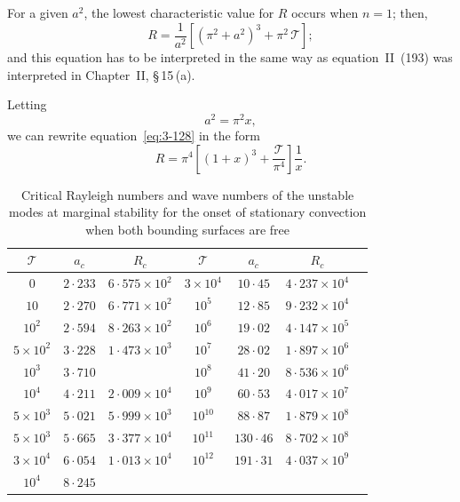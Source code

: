 For a given $a^2$, the lowest characteristic value for $R$ occurs when $n = 1$; then,
\begin{equation}\label{eq:3-128}
R = \frac{1}{a^2}[(\pi^2 + a^2)^3 + \pi^2\,\mathscr{T}];
\end{equation}
and this equation has to be interpreted in the same way as equation~II~(193) was interpreted in Chapter~II, \S\,15\,(a).

Letting
\begin{equation}\label{eq:3-129}
a^2 = \pi^2 x,
\end{equation}
we can rewrite equation~\eqref{eq:3-128} in the form
\begin{equation}\label{eq:3-130}
R = \pi^4\!\left[(1+x)^3 + \frac{\mathscr{T}}{\pi^4}\right]\!\frac{1}{x}.
\end{equation}

\begin{table}[ht]
\centering
\caption{Critical Rayleigh numbers and wave numbers of the unstable modes at marginal stability for the onset of stationary convection when both bounding surfaces are free}
\label{tab:VII}
\begin{tabular}{ccccccc}
\hline
$\mathscr{T}$ & $a_c$ & $R_c$ & $\mathscr{T}$ & $a_c$ & $R_c$ \\
\hline
0 & $2{\cdot}233$ & $6{\cdot}575\times 10^2$ & $3\times 10^4$ & $10{\cdot}45$ & $4{\cdot}237\times 10^4$ \\
$10$ & $2{\cdot}270$ & $6{\cdot}771\times 10^2$ & $10^5$ & $12{\cdot}85$ & $9{\cdot}232\times 10^4$ \\
$10^2$ & $2{\cdot}594$ & $8{\cdot}263\times 10^2$ & $10^6$ & $19{\cdot}02$ & $4{\cdot}147\times 10^5$ \\
$5\times 10^2$ & $3{\cdot}228$ & $1{\cdot}473\times 10^3$ & $10^7$ & $28{\cdot}02$ & $1{\cdot}897\times 10^6$ \\
$10^3$ & $3{\cdot}710$ & & $10^8$ & $41{\cdot}20$ & $8{\cdot}536\times 10^6$ \\
$10^4$ & $4{\cdot}211$ & $2{\cdot}009\times 10^4$ & $10^9$ & $60{\cdot}53$ & $4{\cdot}017\times 10^7$ \\
$5\times 10^3$ & $5{\cdot}021$ & $5{\cdot}999\times 10^3$ & $10^{10}$ & $88{\cdot}87$ & $1{\cdot}879\times 10^8$ \\
$5\times 10^3$ & $5{\cdot}665$ & $3{\cdot}377\times 10^4$ & $10^{11}$ & $130{\cdot}46$ & $8{\cdot}702\times 10^8$ \\
$3\times 10^4$ & $6{\cdot}054$ & $1{\cdot}013\times 10^4$ & $10^{12}$ & $191{\cdot}31$ & $4{\cdot}037\times 10^9$ \\
$10^4$ & $8{\cdot}245$ & & & & \\
\hline
\end{tabular}
\end{table}

